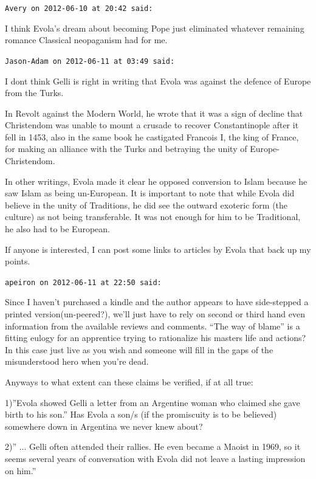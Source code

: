 \begin{footnotesize}
\begin{sffamily}
\texttt{Avery on 2012-06-10 at 20:42 said:}

I think Evola's dream about becoming Pope just eliminated whatever remaining romance Classical neopaganism had for me.

\hfill

\texttt{Jason-Adam on 2012-06-11 at 03:49 said:}

I dont think Gelli is right in writing that Evola was against the defence of Europe from the Turks.

In Revolt against the Modern World, he wrote that it was a sign of decline that Christendom was unable to mount a crusade to recover Constantinople after it fell in 1453, also in the same book he castigated Francois I, the king of France, for making an alliance with the Turks and betraying the unity of Europe-Christendom.

In other writings, Evola made it clear he opposed conversion to Islam because he saw Islam as being un-European. It is important to note that while Evola did believe in the unity of Traditions, he did see the outward exoteric form (the culture) as not being transferable. It was not enough for him to be Traditional, he also had to be European.

If anyone is interested, I can post some links to articles by Evola that back up my points.

\hfill

\texttt{apeiron on 2012-06-11 at 22:50 said:}

Since I haven't purchased a kindle and the author appears to have side-stepped a printed version(un-peered?), we'll just have to rely on second or third hand even information from the available reviews and comments. ``The way of blame'' is a fitting eulogy for an apprentice trying to rationalize his masters life and actions? In this case just live as you wish and someone will fill in the gaps of the misunderstood hero when you're dead.

Anyways to what extent can these claims be verified, if at all true:

1)''Evola showed Gelli a letter from an Argentine woman who claimed she gave birth to his son.'' Has Evola a son/s (if the promiscuity is to be believed) somewhere down in Argentina we never knew about?

2)'' ... Gelli often attended their rallies. He even became a Maoist in 1969, so it seems several years of conversation with Evola did not leave a lasting impression on him.''


\end{sffamily}
\end{footnotesize}
